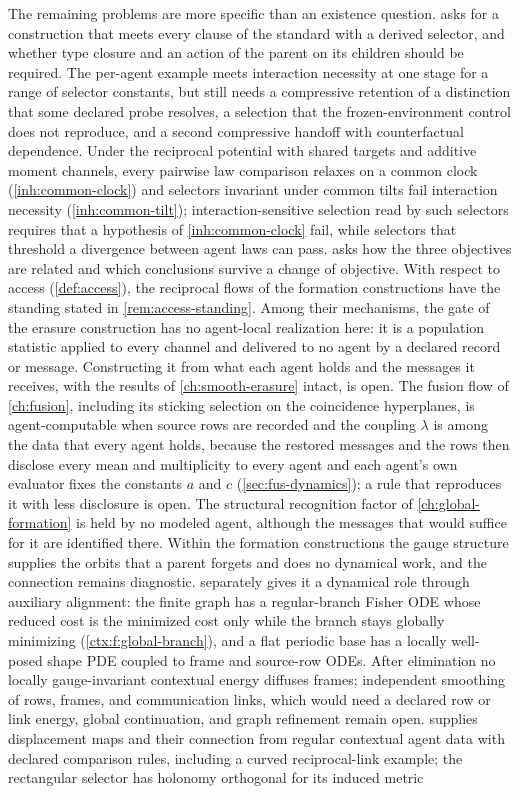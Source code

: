 The remaining problems are more specific than an existence question.  asks for a construction that meets every clause of the standard with a derived selector, and whether type closure and an action of the parent on its children should be required. The per-agent example meets interaction necessity at one stage for a range of selector constants, but still needs a compressive retention of a distinction that some declared probe resolves, a selection that the frozen-environment control does not reproduce, and a second compressive handoff with counterfactual dependence. Under the reciprocal potential with shared targets and additive moment channels, every pairwise law comparison relaxes on a common clock (\cref{inh:common-clock}) and selectors invariant under common tilts fail interaction necessity (\cref{inh:common-tilt}); interaction-sensitive selection read by such selectors requires that a hypothesis of \cref{inh:common-clock} fail, while selectors that threshold a divergence between agent laws can pass.  asks how the three objectives are related and which conclusions survive a change of objective. With respect to access (\cref{def:access}), the reciprocal flows of the formation constructions have the standing stated in \cref{rem:access-standing}. Among their mechanisms, the gate of the erasure construction has no agent-local realization here: it is a population statistic applied to every channel and delivered to no agent by a declared record or message. Constructing it from what each agent holds and the messages it receives, with the results of \cref{ch:smooth-erasure} intact, is open. The fusion flow of \cref{ch:fusion}, including its sticking selection on the coincidence hyperplanes, is agent-computable when source rows are recorded and the coupling $\lambda$ is among the data that every agent holds, because the restored messages and the rows then disclose every mean and multiplicity to every agent and each agent's own evaluator fixes the constants $a$ and $c$ (\cref{sec:fus-dynamics}); a rule that reproduces it with less disclosure is open. The structural recognition factor of \cref{ch:global-formation} is held by no modeled agent, although the messages that would suffice for it are identified there. Within the formation constructions the gauge structure supplies the orbits that a parent forgets and does no dynamical work, and the connection remains diagnostic.  separately gives it a dynamical role through auxiliary alignment: the finite graph has a regular-branch Fisher ODE whose reduced cost is the minimized cost only while the branch stays globally minimizing (\cref{ctx:f:global-branch}), and a flat periodic base has a locally well-posed shape PDE coupled to frame and source-row ODEs. After elimination no locally gauge-invariant contextual energy diffuses frames; independent smoothing of rows, frames, and communication links, which would need a declared row or link energy, global continuation, and graph refinement remain open.  supplies displacement maps and their connection from regular contextual agent data with declared comparison rules, including a curved reciprocal-link example; the rectangular selector has holonomy orthogonal for its induced metric 